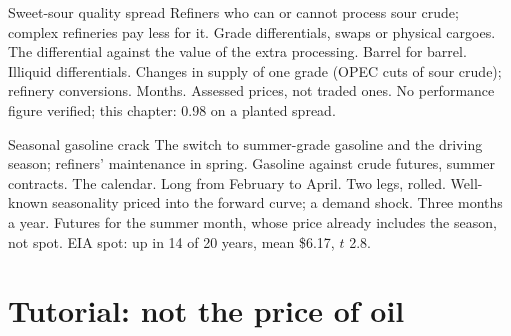 \begin{strategyfile}{Sweet-sour quality spread}\label{strat:s2:commodity-spreads:quality}
 Refiners who can or cannot process sour crude; complex refineries pay less for it.
 Grade differentials, swaps or physical cargoes.
 The differential against the value of the extra processing.
 Barrel for barrel.
 Illiquid differentials.
 Changes in supply of one grade (OPEC cuts of sour crude); refinery conversions.
 Months.
 Assessed prices, not traded ones.
 No performance figure verified; this chapter: 0.98 on a planted spread.
\end{strategyfile}

\begin{strategyfile}{Seasonal gasoline crack}\label{strat:s2:commodity-spreads:season}
 The switch to summer-grade gasoline and the driving season; refiners' maintenance in spring.
 Gasoline against crude futures, summer contracts.
 The calendar.
 Long from February to April.
 Two legs, rolled.
 Well-known seasonality priced into the forward curve; a demand shock.
 Three months a year.
 Futures for the summer month, whose price already includes the season, not spot.
 EIA spot: up in 14 of 20 years, mean \$6.17, $t$ 2.8.
\end{strategyfile}

\section{Tutorial: not the price of oil}\label{tut:s2:commodity-spreads:tut}

